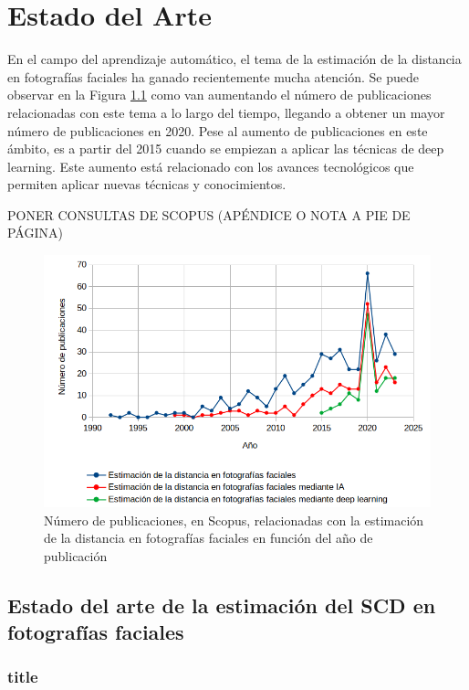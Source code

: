 \chapter{Estado del Arte}
\thispagestyle{empty}

En el campo del aprendizaje automático, el tema de la estimación de la distancia en fotografías faciales ha ganado recientemente mucha atención. Se puede observar en la Figura \ref{fig5} como van aumentando el número de publicaciones relacionadas con este tema a lo largo del tiempo, llegando a obtener un mayor número de publicaciones en 2020. Pese al aumento de publicaciones en este ámbito, es a partir del 2015 cuando se empiezan a aplicar las técnicas de deep learning. Este aumento está relacionado con los avances tecnológicos que permiten aplicar nuevas técnicas y conocimientos. 

PONER CONSULTAS DE SCOPUS (APÉNDICE O NOTA A PIE DE PÁGINA)

\begin{figure}[h]
	\centering
	\includegraphics[scale=0.5]{imagenes/cap3/grafica_scopus3.png}
	\caption{Número de publicaciones, en Scopus, relacionadas con la estimación de la distancia en fotografías faciales en función del año de publicación}
	\label{fig5}
\end{figure}

\section{Estado del arte de la estimación del SCD en fotografías faciales}

\subsection{title}

